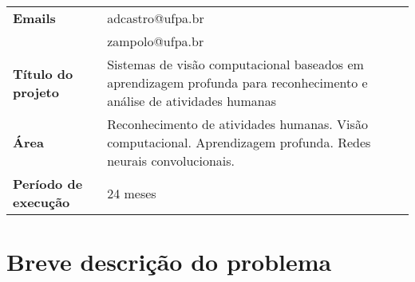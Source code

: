 \begin{table}[!th]
\begin{tabular}{|l p{}|}
\textbf{Emails}               & adcastro@ufpa.br\\
	                      & zampolo@ufpa.br\\
\textbf{Título do projeto}    & Sistemas de visão computacional baseados em aprendizagem profunda para reconhecimento e análise de atividades humanas\\
\textbf{Área}                 & Reconhecimento de atividades humanas. Visão computacional. Aprendizagem profunda. Redes neurais convolucionais.\\
\textbf{Período de execução}  & 24 meses\\
\hline
\end{tabular}
\end{table}
\newpage

\tableofcontents\newpage


%

\section{Breve descrição do problema}
\label{sec:descr}


%

%

